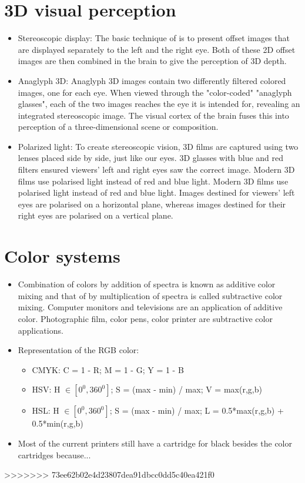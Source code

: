 \documentclass{article}
\begin{document}
\section{3D visual perception}
\begin{itemize}
	\item Stereoscopic display: The basic technique of is to present offset images that are displayed separately to the left and the right eye. Both of these 2D offset images are then combined in the brain to give the perception of 3D depth.
	
	\item Anaglyph 3D: Anaglyph 3D images contain two differently filtered colored images, one for each eye. When viewed through the "color-coded" "anaglyph glasses", each of the two images reaches the eye it is intended for, revealing an integrated stereoscopic image. The visual cortex of the brain fuses this into perception of a three-dimensional scene or composition.
	
	\item Polarized light: To create stereoscopic vision, 3D films are captured using two lenses placed side by side, just like our eyes. 3D glasses with blue and red filters ensured viewers’ left and right eyes saw the correct image. Modern 3D films use polarised light instead of red and blue light. Modern 3D films use polarised light instead of red and blue light.  Images destined for viewers' left eyes are polarised on a horizontal plane, whereas images destined for their right eyes are polarised on a vertical plane.
\end{itemize}
\section{Color systems}
\begin{itemize}
	\item Combination of colors by addition of spectra is known as additive color mixing and that of by multiplication of spectra is called subtractive color mixing. Computer monitors and televisions are an application of additive color. Photographic film, color pens, color printer are subtractive color applications.
	\item Representation of the RGB color:
	\begin{itemize}
		\item CMYK: C = 1 - R; M = 1 - G; Y = 1 - B
		\item HSV: H $\in [ 0^0, 360^0]$; S = (max - min) / max; V = max(r,g,b)
		\item HSL: H $\in [ 0^0, 360^0]$; S = (max - min) / max; L = 0.5*max(r,g,b) + 0.5*min(r,g,b)
	\end{itemize}
	\item Most of the current printers still have a cartridge for black besides the color cartridges because...
\end{itemize}
>>>>>>> 73ee62b02e4d23807dea91dbcc0dd5c40ea421f0
\end{document}
